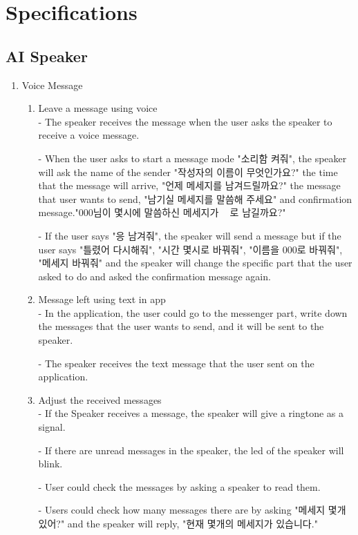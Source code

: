 \documentclass[conference]{IEEEtran}
\begin{document}
\section{Specifications}

\subsection{AI Speaker}
\begin{enumerate}
    \item Voice Message
    \begin{enumerate}
        \item Leave a message using voice\\
        - The speaker receives the message when the user asks the speaker to receive a voice message.
        
        - When the user asks to start a message mode "소리함 켜줘", the speaker will ask the name of the sender "작성자의 이름이 무엇인가요?" the time that the message will arrive, "언제 메세지를 남겨드릴까요?" the message that user wants to send, "남기실 메세지를 말씀해 주세요" and confirmation message."000님이 몇시에 말씀하신 메세지가 ~ 로 남길까요?"
        
        - If the user says "응 남겨줘", the speaker will send a message but if the user says "틀렸어 다시해줘", "시간 몇시로 바꿔줘", "이름을 000로 바꿔줘", "메세지 바꿔줘" and the speaker will change the specific part that the user asked to do and asked the confirmation message again.\\
        \item Message left using text in app\\
        - In the application, the user could go to the messenger part, write down the messages that the user wants to send, and it will be sent to the speaker.
        
        - The speaker receives the text message that the user sent on the application.\\
        \item Adjust the received messages\\
        - If the Speaker receives a message, the speaker will give a ringtone as a signal.
        
        - If there are unread messages in the speaker, the led of the speaker will blink.
        
        - User could check the messages by asking a speaker to read them.
        
        - Users could check how many messages there are by asking "메세지 몇개 있어?" and the speaker will reply, "현재 몇개의 메세지가 있습니다."
        

\end{enumerate}
\end{enumerate}
\end{document}
